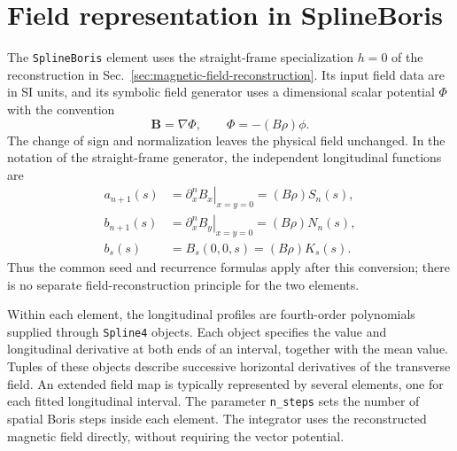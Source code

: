 \section{Field representation in SplineBoris}
\label{sec:splineboris-field-representation}
\label{chapter:splineboris-field-expansion}

The \texttt{SplineBoris} element uses the straight-frame specialization
\(h=0\) of the reconstruction in
Sec.~\ref{sec:magnetic-field-reconstruction}. Its input field data are in
SI units, and its symbolic field generator uses a dimensional scalar
potential \(\Phi\) with the convention
\begin{equation}
 \bm B=\nabla\Phi,\qquad \Phi=-(B\rho)\phi.
 \label{field-expansion:B-from-phi}
\end{equation}
The change of sign and normalization leaves the physical field unchanged.
In the notation of the straight-frame generator, the independent
longitudinal functions are
\begin{align}
 a_{n+1}(s)&=\left.\partial_x^n B_x\right|_{x=y=0}
                  =(B\rho)S_n(s),\\
 b_{n+1}(s)&=\left.\partial_x^n B_y\right|_{x=y=0}
                  =(B\rho)N_n(s),\\
 b_s(s)&=B_s(0,0,s)=(B\rho)K_s(s).
\end{align}
Thus the common seed and recurrence formulas apply after this conversion;
there is no separate field-reconstruction principle for the two elements.

Within each element, the longitudinal profiles are fourth-order polynomials
supplied through \texttt{Spline4} objects. Each object specifies the value
and longitudinal derivative at both ends of an interval, together with the
mean value. Tuples of these objects describe successive horizontal
derivatives of the transverse field. An extended field map is typically
represented by several elements, one for each fitted longitudinal interval.
The parameter \texttt{n\_steps} sets the number of spatial Boris steps
inside each element. The integrator uses the reconstructed magnetic field
directly, without requiring the vector potential.
